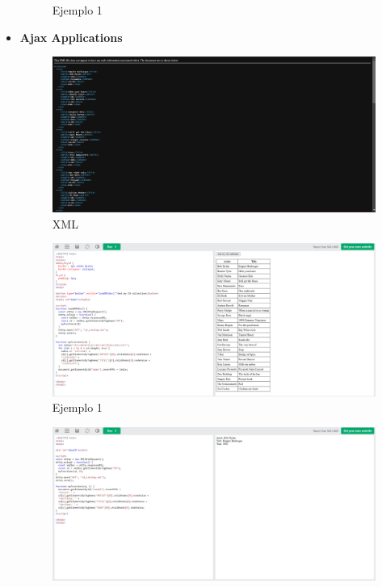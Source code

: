 \documentclass{article}
\begin{document}
\begin{itemize}
\begin{figure}[H]
			\caption{Ejemplo 1}
		\end{figure}
		\item \textbf{Ajax Applications}
		\begin{figure}[H]
			\centering
			\includegraphics[width=1\textwidth,keepaspectratio]{img/XML.png}
			\caption{XML}
		\end{figure}
		\newpage
		\begin{figure}[H]
			\centering
			\includegraphics[width=1\textwidth,keepaspectratio]{img/ejemplo31.png}
			\caption{Ejemplo 1}
		\end{figure}
		\begin{figure}[H]
			\centering
			\includegraphics[width=1\textwidth,keepaspectratio]{img/ejemplo32.png}

\end{figure}
\end{itemize}
\end{document}
